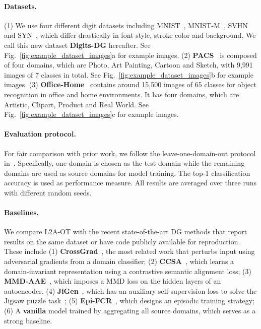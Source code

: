 \documentclass[runningheads]{llncs}
\begin{document}
\paragraph{Datasets.}
(1) We use four different digit datasets including MNIST~\cite{lecun1998mnist}, MNIST-M~\cite{ganin2015unsupervised}, SVHN~\cite{netzer2011svhn} and SYN~\cite{ganin2015unsupervised}, which differ drastically in font style, stroke color and background. We call this new dataset \textbf{Digits-DG} hereafter. See Fig.~\ref{fig:example_dataset_images}a for example images.
(2) \textbf{PACS}~\cite{li2017deeper} is composed of four domains, which are Photo, Art Painting, Cartoon and Sketch, with 9,991 images of 7 classes in total. See Fig.~\ref{fig:example_dataset_images}b for example images.
(3) \textbf{Office-Home}~\cite{office_home} contains around 15,500 images of 65 classes for object recognition in office and home environments. It has four domains, which are Artistic, Clipart, Product and Real World. See Fig.~\ref{fig:example_dataset_images}c for example images.

\paragraph{Evaluation protocol.}
For fair comparison with prior work, we follow the leave-one-domain-out protocol in~\cite{li2017deeper,cvpr19JiGen,li2019episodic}. Specifically, one domain is chosen as the test domain while the remaining domains are used as source domains for model training. The top-1 classification accuracy is used as performance measure. All results are averaged over three runs with different random seeds.

\paragraph{Baselines.}
We compare L2A-OT with the recent state-of-the-art DG methods that report results on the same dataset or have code publicly available for reproduction. These include
(1) \textbf{CrossGrad}~\cite{shankar2018generalizing}, the most related work that perturbs input using adversarial gradients from a domain classifier;
(2) \textbf{CCSA}~\cite{motiian2017unified}, which learns a domain-invariant representation using a contrastive semantic alignment loss;
(3) \textbf{MMD-AAE}~\cite{li2018mmdaae}, which imposes a MMD loss on the hidden layers of an autoencoder.
(4) \textbf{JiGen}~\cite{cvpr19JiGen}, which has an auxiliary self-supervision loss to solve the Jigsaw puzzle task~\cite{jigsaw_puzzles};
(5) \textbf{Epi-FCR}~\cite{li2019episodic}, which designs an episodic training strategy;
(6) A \textbf{vanilla} model trained by aggregating all source domains, which serves as a strong baseline.
\end{document}
